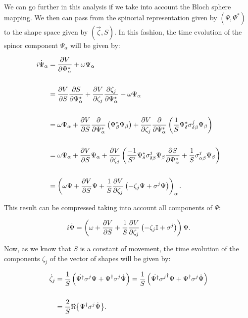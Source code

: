 We can go further in this analysis if we take into account the Bloch sphere mapping. We then can pass from the spinorial representation given by $(\Psi,\Psi^*)$ to the shape space given by $(\vec{\zeta},S)$. In this fashion, the time evolution of the spinor component $\Psi_\alpha$ will be given by:

\begin{align*}
i\dot{\Psi}_\alpha &= \frac{\partial V}{\partial \Psi_\alpha^*} + \omega\Psi_\alpha\\
\\
&=  \frac{\partial V}{\partial S}\frac{\partial S}{\partial \Psi_\alpha^*}+ \frac{\partial V}{\partial \zeta_j}\frac{\partial \zeta_j}{\partial \Psi_\alpha^*} + \omega\Psi_\alpha  \\
\\
&= \omega \Psi_\alpha + \frac{\partial V}{\partial S}\frac{\partial}{\partial \Psi_\alpha^*}\left( \Psi^*_\beta\Psi_\beta \right) + \frac{\partial V}{\partial \zeta_j}\frac{\partial}{\partial \Psi_\alpha^*}\left( \frac{1}{S}\Psi^*_{\delta}\sigma^j_{\delta\beta}\Psi_\beta \right)\\
\\
&= \omega \Psi_\alpha + \frac{\partial V}{\partial S}\Psi_\alpha +\frac{\partial V}{\partial \zeta_j}\left(  \frac{-1}{S^2}\Psi^*_{\delta}\sigma^j_{\delta\beta}\Psi_\beta\frac{\partial S}{\partial \Psi_\alpha^*} +\frac{1}{S}\sigma^j_{\alpha\beta}\Psi_\beta \right)\\
\\
&= \left( \omega \Psi +\frac{\partial V}{\partial S}\Psi+ \frac{1}{S}\frac{\partial V}{\partial \zeta_j}\left( -\zeta_j \Psi + \sigma^j \Psi \right) \right)_\alpha.
\end{align*}

This result can be compressed taking into account all components of $\Psi$:

\begin{equation}
i\dot{\Psi} = \left( \omega +\frac{\partial V}{\partial S}+ \frac{1}{S}\frac{\partial V}{\partial \zeta_j}\left( -\zeta_j \mathbb{I}  + \sigma^j  \right) \right)\Psi.
\label{eq:Psi_time_ev}
\end{equation}

Now, as we know that $S$ is a constant of movement, the time evolution of the components $\zeta_j$  of the vector of shapes will be given by:

\begin{align*}
\dot{\zeta}_j &= \frac{1}{S}\left(  \dot{\Psi^{\dagger}}\sigma^j\Psi + \Psi^{\dagger}\sigma^j\dot{\Psi} \right) =
\frac{1}{S}\left(  \dot{\Psi^{\dagger}}{\sigma^j}^{\dagger}\Psi + \Psi^{\dagger}\sigma^j\dot{\Psi} \right)\\
\\
&= \frac{2}{S}\Re{\left\{\Psi^{\dagger}\sigma^j\dot{\Psi}\right\}}.
\end{align*}

